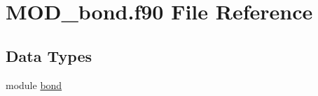 \hypertarget{MOD__bond_8f90}{\section{M\-O\-D\-\_\-bond.\-f90 File Reference}
\label{MOD__bond_8f90}
}
\subsection*{Data Types}
\begin{DoxyCompactItemize}
\item 
module \hyperlink{classbond}{bond}
\end{DoxyCompactItemize}
